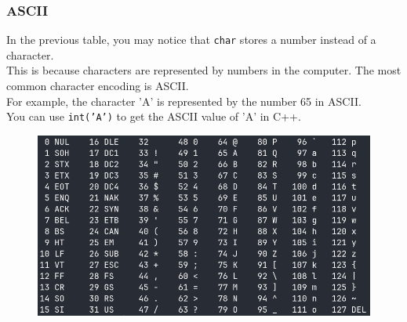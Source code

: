\documentclass[xcolor=dvipsnames]{beamer}
\begin{document}
    \begin{frame}
        \frametitle{ASCII}
        In the previous table, you may notice that \texttt{char} stores a number instead of a character.\\
        This is because characters are represented by numbers in the computer. The most common character encoding is ASCII.\\
        For example, the character 'A' is represented by the number 65 in ASCII.\\
        You can use \texttt{int('A')} to get the ASCII value of 'A' in C++.
    \end{frame}

    \begin{frame}
        \begin{figure}
            \centering
            \includegraphics[width=1\textwidth]{src/ASCII.png}
        \end{figure}
    \end{frame}
\end{document}
